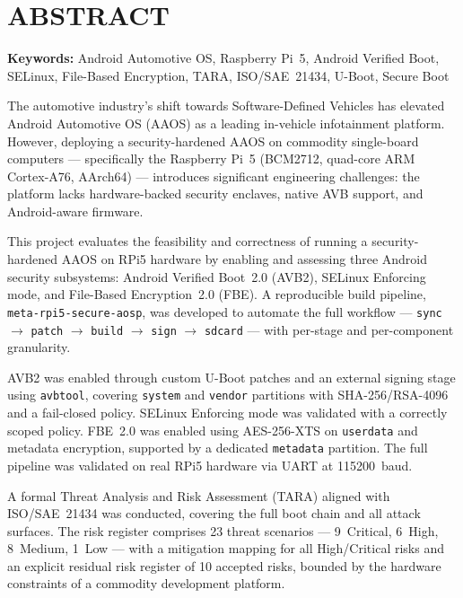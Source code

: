 \chapter*{ABSTRACT}

\vspace{1.5em}
\noindent \textbf{Keywords:} Android Automotive OS, Raspberry Pi~5, Android Verified Boot, SELinux, File-Based Encryption, TARA, ISO/SAE~21434, U-Boot, Secure Boot

\vspace{1em}

The automotive industry's shift towards Software-Defined Vehicles has elevated Android Automotive OS (AAOS) as a leading in-vehicle infotainment platform. However, deploying a security-hardened AAOS on commodity single-board computers — specifically the Raspberry Pi~5 (BCM2712, quad-core ARM Cortex-A76, AArch64) — introduces significant engineering challenges: the platform lacks hardware-backed security enclaves, native AVB support, and Android-aware firmware.

This project evaluates the feasibility and correctness of running a security-hardened AAOS on RPi5 hardware by enabling and assessing three Android security subsystems: Android Verified Boot~2.0 (AVB2), SELinux Enforcing mode, and File-Based Encryption~2.0 (FBE). A reproducible build pipeline, \texttt{meta-rpi5-secure-aosp}, was developed to automate the full workflow — \texttt{sync} $\to$ \texttt{patch} $\to$ \texttt{build} $\to$ \texttt{sign} $\to$ \texttt{sdcard} — with per-stage and per-component granularity.

AVB2 was enabled through custom U-Boot patches and an external signing stage using \texttt{avbtool}, covering \texttt{system} and \texttt{vendor} partitions with SHA-256/RSA-4096 and a fail-closed policy. SELinux Enforcing mode was validated with a correctly scoped policy. FBE~2.0 was enabled using AES-256-XTS on \texttt{userdata} and metadata encryption, supported by a dedicated \texttt{metadata} partition. The full pipeline was validated on real RPi5 hardware via UART at 115200~baud.

A formal Threat Analysis and Risk Assessment (TARA) aligned with ISO/SAE~21434 was conducted, covering the full boot chain and all attack surfaces. The risk register comprises 23 threat scenarios — 9~Critical, 6~High, 8~Medium, 1~Low — with a mitigation mapping for all High/Critical risks and an explicit residual risk register of 10 accepted risks, bounded by the hardware constraints of a commodity development platform.
